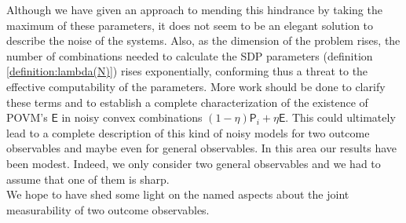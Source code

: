 \documentclass[10pt, a4paper]{amsart}
\begin{document}
 Although we have given an approach to mending this hindrance by taking the maximum of these parameters, it does not seem to be an elegant solution to describe the noise of the systems. Also, as the dimension of the problem rises, the number of combinations needed to calculate the SDP parameters  (definition \ref{definition:lambda(N)}) rises exponentially, conforming thus a threat to the effective computability of the parameters. More work should be done to clarify these terms and to establish a complete characterization of the existence of POVM's $\mathsf{E}$ in noisy convex combinations $(1-\eta) \mathsf{P}_{i} + \eta \mathsf{E}$. This could ultimately lead to a complete description of this kind of noisy models for two outcome observables and maybe even for general observables. In this area our results have been modest. Indeed, we only consider two general observables and we had to assume that one of them is sharp. \\
 We hope to have shed some light on the named aspects about the joint measurability of two outcome observables.









\newpage


\end{document}
